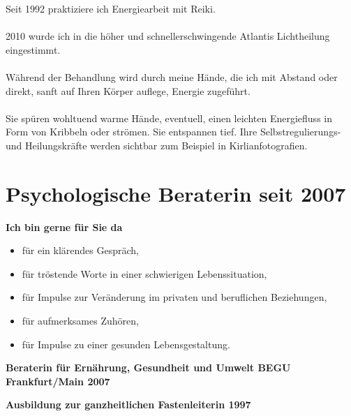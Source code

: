\documentclass[10pt,foldmark,notumble]{leaflet}
\begin{document}
Seit 1992 praktiziere ich Energiearbeit mit Reiki.\\ 
\\ 
2010 wurde ich in die höher und schnellerschwingende Atlantis Lichtheilung eingestimmt.\\
\\
Während der Behandlung wird durch meine Hände, die ich mit Abstand oder direkt, sanft auf Ihren Körper auflege, Energie zugeführt.\\
\\
Sie spüren wohltuend warme Hände, eventuell, einen \mbox{leichten} Energiefluss in Form von Kribbeln oder strömen. Sie entspannen tief. Ihre Selbstregulierungs- und Heilungskräfte werden sichtbar zum Beispiel in Kirlianfotografien.






\newpage


\section{Psychologische Beraterin seit 2007}

\vspace{2mm}

{\bf Ich bin gerne für Sie da}\\
\begin{itemize}
\item  für ein klärendes Gespräch,
\item  für tröstende Worte in einer schwierigen Lebenssituation,
\item  für Impulse zur Veränderung im privaten und beruflichen Beziehungen,
\item  für aufmerksames Zuhören,
\item  für Impulse zu einer gesunden Lebensgestaltung.
\end{itemize}

\vspace{2mm}

{\bf Beraterin für Ernährung, Gesundheit und Umwelt BEGU Frankfurt/Main 2007}\\

\vspace{2mm}

{\bf Ausbildung zur ganzheitlichen Fastenleiterin 1997}\\
\end{document}
